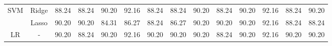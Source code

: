 \begin{landscape}
\begin{table}[]
{\begin{tabular}{cc|cccccccccccc}
\multirow{2}{*}{SVM}            & Ridge                                 & 88.24                                                             & 88.24                                                                & 90.20                                                                & 92.16                                                               & 88.24                                                            & \multicolumn{1}{c|}{88.24}                                                                   & 90.20                                                             & 88.24                                                                & 90.20                                                                & 92.16                                                               & 88.24                                                            & 90.20                                                                   \\
                                & Lasso                                 & 90.20                                                             & 90.20                                                                & 84.31                                                                & 86.27                                                               & 88.24                                                            & \multicolumn{1}{c|}{86.27}                                                                   & 90.20                                                             & 90.20                                                                & 90.20                                                                & 92.16                                                               & 88.24                                                            & 88.24                                                                   \\ \hline
\multirow{3}{*}{LR}             & -                                     & 90.20                                                             & 88.24                                                                & 90.20                                                                & 92.16                                                               & 90.20                                                            & \multicolumn{1}{c|}{90.20}                                                                   & 90.20                                                             & 88.24                                                                & 90.20                                                                & 92.16                                                               & 90.20                                                            & 90.20                                                                   \\

\end{tabular}}
\end{table}
\end{landscape}
